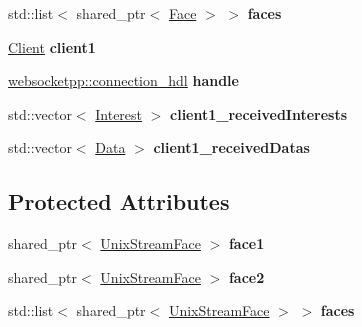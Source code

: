 \begin{DoxyCompactItemize}
\item 
std\+::list$<$ shared\+\_\+ptr$<$ \hyperlink{classnfd_1_1Face}{Face} $>$ $>$ {\bfseries faces}\hypertarget{classnfd_1_1tests_1_1EndToEndFixture_a73a9f1bc20a252d2541f5d9a53009422}{}\label{classnfd_1_1tests_1_1EndToEndFixture_a73a9f1bc20a252d2541f5d9a53009422}

\item 
\hyperlink{classwebsocketpp_1_1client}{Client} {\bfseries client1}\hypertarget{classnfd_1_1tests_1_1EndToEndFixture_a34007a0933dfa7dcb802057921051ad7}{}\label{classnfd_1_1tests_1_1EndToEndFixture_a34007a0933dfa7dcb802057921051ad7}

\item 
\hyperlink{namespacewebsocketpp_a6b3d26a10ee7229b84b776786332631d}{websocketpp\+::connection\+\_\+hdl} {\bfseries handle}\hypertarget{classnfd_1_1tests_1_1EndToEndFixture_a98974a3944ed2b90dafcd5b641471cc3}{}\label{classnfd_1_1tests_1_1EndToEndFixture_a98974a3944ed2b90dafcd5b641471cc3}

\item 
std\+::vector$<$ \hyperlink{classndn_1_1Interest}{Interest} $>$ {\bfseries client1\+\_\+received\+Interests}\hypertarget{classnfd_1_1tests_1_1EndToEndFixture_afd11bb8c6c8ff119bc9474ea164086a3}{}\label{classnfd_1_1tests_1_1EndToEndFixture_afd11bb8c6c8ff119bc9474ea164086a3}

\item 
std\+::vector$<$ \hyperlink{classndn_1_1Data}{Data} $>$ {\bfseries client1\+\_\+received\+Datas}\hypertarget{classnfd_1_1tests_1_1EndToEndFixture_a7faf183b0ee870358ddc770339ed005e}{}\label{classnfd_1_1tests_1_1EndToEndFixture_a7faf183b0ee870358ddc770339ed005e}

\end{DoxyCompactItemize}
\subsection*{Protected Attributes}
\begin{DoxyCompactItemize}
\item 
shared\+\_\+ptr$<$ \hyperlink{classnfd_1_1UnixStreamFace}{Unix\+Stream\+Face} $>$ {\bfseries face1}\hypertarget{classnfd_1_1tests_1_1EndToEndFixture_ac87382aaef50ad8e51805044a366e5c6}{}\label{classnfd_1_1tests_1_1EndToEndFixture_ac87382aaef50ad8e51805044a366e5c6}

\item 
shared\+\_\+ptr$<$ \hyperlink{classnfd_1_1UnixStreamFace}{Unix\+Stream\+Face} $>$ {\bfseries face2}\hypertarget{classnfd_1_1tests_1_1EndToEndFixture_ae2aaa477f28e52a89cfc99eadf278fbe}{}\label{classnfd_1_1tests_1_1EndToEndFixture_ae2aaa477f28e52a89cfc99eadf278fbe}

\item 
std\+::list$<$ shared\+\_\+ptr$<$ \hyperlink{classnfd_1_1UnixStreamFace}{Unix\+Stream\+Face} $>$ $>$ {\bfseries faces}\hypertarget{classnfd_1_1tests_1_1EndToEndFixture_a9b2323ca96a3fef9cc981e019fe7c69c}{}\label{classnfd_1_1tests_1_1EndToEndFixture_a9b2323ca96a3fef9cc981e019fe7c69c}

\end{DoxyCompactItemize}


